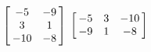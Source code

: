 {$\left[\hskip -3pt \begin{array}{cc} -5&-9\\  3&1
\\  -10&-8\end{array}\hskip -3pt \right] $}
{$\left[\hskip -3pt \begin{array}{ccc} -5&3&-10\\  -9&1&-8
\end{array}\hskip -3pt \right]$}

